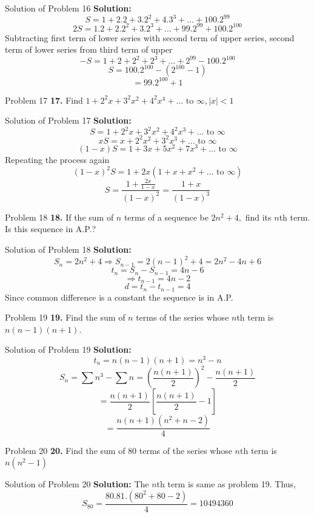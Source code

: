 \documentclass[aspectratio=1610,8pt]{beamer}
\begin{document}
\begin{frame}{Solution of Problem 16}
  \textbf{Solution:} $$S = 1 + 2.2 + 3.2^2 + 4.3^3 + \ldots + 100.2^{99}$$
  $$2S = 1.2 + 2.2^2 + 3.2^3 + \ldots + 99.2^{99} + 100.2^{100}$$
  Subtracting first term of lower series with second term of upper series, second term of lower series from third term of upper
  $$-S = 1 + 2 + 2^2 + 2^3 + \ldots + 2^{99} - 100.2^{100}$$
  $$S = 100.2^{100} - (2^{100} - 1)$$
  $$= 99.2^{100} + 1$$
\end{frame}
\begin{frame}{Problem 17}
  \textbf{17.} Find $1 + 2^2x + 3^2x^2 + 4^2x^4 + \ldots \text{~to~}\infty, |x| < 1$
\end{frame}
\begin{frame}{Solution of Problem 17}
  \textbf{Solution:}$$S = 1 + 2^2x + 3^2x^2 + 4^2x^3 + \ldots \text{~to~}\infty$$
  $$xS = x + 2^2x^2 + 3^2x^3 + \ldots \text{~to~}\infty$$
  $$(1 - x)S = 1 + 3x + 5x^2 + 7x^3 + \ldots \text{~to~}\infty$$
  Repeating the process again
  $$(1 - x)^2S = 1 + 2x(1 + x + x^2 + \ldots \text{~to~}\infty)$$
  $$S = \frac{1 + \frac{2x}{1 - x}}{(1 - x)^2} = \frac{1 + x}{(1 - x)^3}$$
\end{frame}
\begin{frame}{Problem 18}
  \textbf{18.} If the sum of $n$ terms of a sequence be $2n^2 + 4,$ find its $n$th term. Is this sequence in A.P.?
\end{frame}
\begin{frame}{Solution of Problem 18}
  \textbf{Solution:}$$S_n = 2n^2 + 4 \Rightarrow S_{n - 1} = 2(n - 1)^2 + 4 = 2n^2 -4n +6$$
  $$t_n = S_n - S_{n - 1} = 4n - 6$$
  $$\Rightarrow t_{n - 1} = 4n - 2$$
  $$d = t_n - t_{n - 1} = 4$$
  Since common difference is a constant the sequence is in A.P.
\end{frame}
\begin{frame}{Problem 19}
  \textbf{19.} Find the sum of $n$ terms of the series whose $n$th term is $n(n - 1)(n + 1)$.
\end{frame}
\begin{frame}{Solution of Problem 19}
  \textbf{Solution:}$$t_n = n(n - 1)(n + 1) = n^3 - n$$
  $$S_n = \sum n^3 - \sum n = \left(\frac{n(n + 1)}{2}\right)^2 - \frac{n(n + 1)}{2}$$
  $$= \frac{n(n + 1)}{2}\left[\frac{n(n + 1)}{2} - 1\right]$$
  $$= \frac{n(n + 1)(n^2 + n - 2)}{4}$$
\end{frame}
\begin{frame}{Problem 20}
  \textbf{20.} Find the sum of $80$ terms of the series whose $n$th term is $n(n^2 - 1)$
\end{frame}
\begin{frame}{Solution of Problem 20}
  \textbf{Solution:} The $n$th term is same as problem 19. Thus,
  $$S_{80} = \frac{80.81.(80^2 + 80 - 2)}{4} = 10494360$$
\end{frame}
\end{document}
